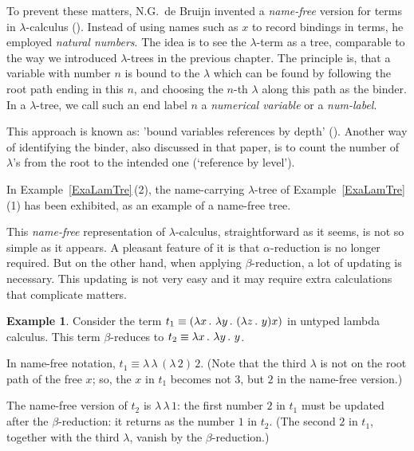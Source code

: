 \documentclass{article}
\theoremstyle{plain}
\theoremstyle{definition}
\newtheorem{Exa}[The]{Example}
\begin{document}
\smallskip

To prevent these matters, N.G.\ de Bruijn invented a {\it name-free\/} version for terms in $\lambda$-calculus (\citealp{deB72}). Instead of using names such as $x$ to record bindings in terms, he employed {\it natural numbers\/}. The idea is to see the $\lambda$-term as a tree, comparable to the way we introduced $\lambda$-trees in the previous chapter. The principle is, that a variable with number $n$ is bound to the $\lambda$ which can be found by following the root path ending in this $n$, and choosing the $n$-th $\lambda$ along this path as the binder. In a $\lambda$-tree, we call such an end label $n$ a {\em numerical variable\/} or a {\em num-label\/}.

This approach is known as: 'bound variables references by depth' (\citealp{deB78a}). Another way of identifying the binder, also discussed in that paper, is to count the number of $\lambda$'s from the root to the intended one (`reference by level').

In Example~\ref{ExaLamTre}\,(2), the name-carrying $\lambda$-tree of  Example~\ref{ExaLamTre}\,(1) has been exhibited, as an example of a name-free tree.

\smallskip

This {\it name-free\/} representation of $\lambda$-calculus, straightforward as it seems, is not so simple as it appears. A pleasant feature of it is that $\alpha$-reduction is no longer required. But on the other hand, when applying $\beta$-reduction, a lot of updating is necessary. This updating is not very easy and it may require extra calculations that complicate matters.

\begin{Exa}
Consider the term $t_1 \equiv (\lambda x \, . \,\, \lambda y \, . \,\, (\lambda z \, . \,\, y)x)$ in untyped lambda calculus. This term $\beta$-reduces to $t_2 \equiv \lambda x \, . \,\, \lambda y \, . \,\, y$.

In name-free notation, $t_1 \equiv \lambda \,\lambda \,(\lambda \,2)\,2$. (Note that the third $\lambda$ is not on the root path of the free $x$; so, the $x$ in $t_1$ becomes not $3$, but $2$ in the name-free version.)

The name-free version of $t_2$ is $\lambda \, \lambda \, 1$: the first number $2$ in $t_1$ must be updated after the $\beta$-reduction: it returns as the number $1$ in $t_2$. (The second $2$ in $t_1$, together with the third $\lambda$, vanish by the $\beta$-reduction.)
\end{Exa}
\end{document}
